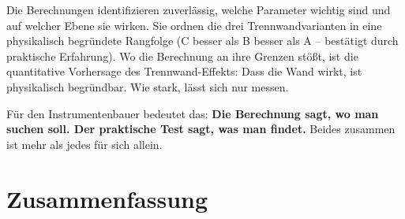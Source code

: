 \documentclass[11pt,a4paper]{article}
\begin{document}
Die Berechnungen identifizieren zuverlässig, welche Parameter wichtig sind und auf welcher Ebene sie wirken. Sie ordnen die drei Trennwandvarianten in eine physikalisch begründete Rangfolge (C besser als B besser als A -- bestätigt durch praktische Erfahrung). Wo die Berechnung an ihre Grenzen stößt, ist die quantitative Vorhersage des Trennwand-Effekts: Dass die Wand wirkt, ist physikalisch begründbar. Wie stark, lässt sich nur messen.

\begin{keybox}
Für den Instrumentenbauer bedeutet das: \textbf{Die Berechnung sagt, wo man suchen soll. Der praktische Test sagt, was man findet.} Beides zusammen ist mehr als jedes für sich allein.
\end{keybox}

\section{Zusammenfassung}
\end{document}
